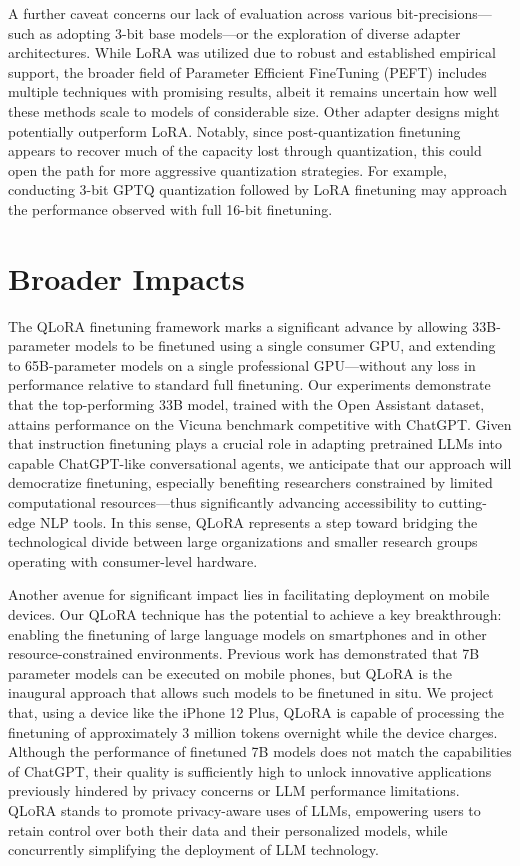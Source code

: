 A further caveat concerns our lack of evaluation across various bit-precisions—such as adopting 3-bit base models—or the exploration of diverse adapter architectures. While LoRA was utilized due to robust and established empirical support, the broader field of Parameter Efficient FineTuning (PEFT) includes multiple techniques with promising results, albeit it remains uncertain how well these methods scale to models of considerable size. Other adapter designs might potentially outperform LoRA. Notably, since post-quantization finetuning appears to recover much of the capacity lost through quantization, this could open the path for more aggressive quantization strategies. For example, conducting 3-bit GPTQ quantization followed by LoRA finetuning may approach the performance observed with full 16-bit finetuning.

\section{Broader Impacts}

The \textsc{QLoRA} finetuning framework marks a significant advance by allowing 33B-parameter models to be finetuned using a single consumer GPU, and extending to 65B-parameter models on a single professional GPU—without any loss in performance relative to standard full finetuning. Our experiments demonstrate that the top-performing 33B model, trained with the Open Assistant dataset, attains performance on the Vicuna benchmark competitive with ChatGPT. Given that instruction finetuning plays a crucial role in adapting pretrained LLMs into capable ChatGPT-like conversational agents, we anticipate that our approach will democratize finetuning, especially benefiting researchers constrained by limited computational resources—thus significantly advancing accessibility to cutting-edge NLP tools. In this sense, \textsc{QLoRA} represents a step toward bridging the technological divide between large organizations and smaller research groups operating with consumer-level hardware.

Another avenue for significant impact lies in facilitating deployment on mobile devices. Our \textsc{QLoRA} technique has the potential to achieve a key breakthrough: enabling the finetuning of large language models on smartphones and in other resource-constrained environments. Previous work has demonstrated that 7B parameter models can be executed on mobile phones, but \textsc{QLoRA} is the inaugural approach that allows such models to be finetuned in situ. We project that, using a device like the iPhone 12 Plus, \textsc{QLoRA} is capable of processing the finetuning of approximately 3 million tokens overnight while the device charges. Although the performance of finetuned 7B models does not match the capabilities of ChatGPT, their quality is sufficiently high to unlock innovative applications previously hindered by privacy concerns or LLM performance limitations. \textsc{QLoRA} stands to promote privacy-aware uses of LLMs, empowering users to retain control over both their data and their personalized models, while concurrently simplifying the deployment of LLM technology.

